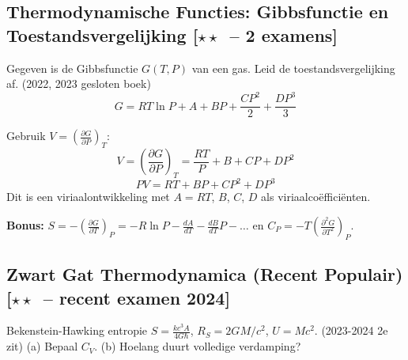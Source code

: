 \documentclass[10pt,a4paper]{article}
\newcommand{\pder}[2]{\left(\frac{\partial #1}{\partial #2}\right)}
\begin{document}
\subsection{Thermodynamische Functies: Gibbsfunctie en Toestandsvergelijking \textnormal{\color{warningred}[$\star\star$\ -- 2 examens]}}

\begin{oefening}{Gegeven is de Gibbsfunctie $G(T,P)$ van een gas. Leid de toestandsvergelijking af. \textnormal{(2022, 2023 gesloten boek)}}
$$G = RT\ln P + A + BP + \frac{CP^2}{2} + \frac{DP^3}{3}$$
\end{oefening}

\begin{oplossing}
Gebruik $V = \pder{G}{P}_T$:
$$V = \pder{G}{P}_T = \frac{RT}{P} + B + CP + DP^2$$
$$\boxed{PV = RT + BP + CP^2 + DP^3}$$
Dit is een viriaalontwikkeling met $A = RT$, $B$, $C$, $D$ als viriaalcoëfficiënten.

\textbf{Bonus:} $S = -\pder{G}{T}_P = -R\ln P - \frac{dA}{dT} - \frac{dB}{dT}P - \ldots$ en $C_P = -T\pder{^2G}{T^2}_P$.
\end{oplossing}

\subsection{Zwart Gat Thermodynamica (Recent Populair) \textnormal{\color{warningred}[$\star\star$\ -- recent examen 2024]}}

\begin{oefening}{Bekenstein-Hawking entropie $S = \frac{kc^3A}{4G\hbar}$, $R_S = 2GM/c^2$, $U = Mc^2$. \textnormal{(2023-2024 2e zit)}}
(a) Bepaal $C_V$. (b) Hoelang duurt volledige verdamping?
\end{oefening}
\end{document}
